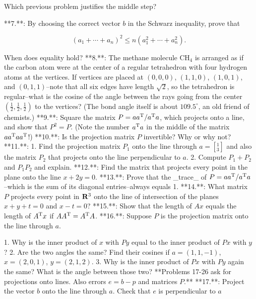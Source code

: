 Which previous problem justifies the middle step?

**7.**: By choosing the correct vector \(b\) in the Schwarz inequality, prove that

\[(a_{1}+\cdots+a_{n})^{2}\leq n(a_{1}^{2}+\cdots+a_{n}^{2}).\]

When does equality hold?
**8.**: The methane molecule CH\({}_{4}\) is arranged as if the carbon atom were at the center of a regular tetrahedron with four hydrogen atoms at the vertices. If vertices are placed at \((0,0,0)\), \((1,1,0)\), \((1,0,1)\), and \((0,1,1)\)--note that all six edges have length \(\sqrt{2}\), so the tetrahedron is regular--what is the cosine of the angle between the rays going from the center \((\frac{1}{2},\frac{1}{2},\frac{1}{2})\) to the vertices? (The bond angle itself is about \(109.5^{\circ}\), an old friend of chemists.)
**9.**: Square the matrix \(P=aa^{\rm T}/a^{\rm T}a\), which projects onto a line, and show that \(P^{2}=P\). (Note the number \(a^{\rm T}a\) in the middle of the matrix \(aa^{\rm T}aa^{\rm T}\)!)
**10.**: Is the projection matrix \(P\) invertible? Why or why not?
**11.**: 1. Find the projection matrix \(P_{1}\) onto the line through \(a=[^{1}_{3}]\) and also the matrix \(P_{2}\) that projects onto the line perpendicular to \(a\). 2. Compute \(P_{1}+P_{2}\) and \(P_{1}P_{2}\) and explain.
**12.**: Find the matrix that projects every point in the plane onto the line \(x+2y=0\).
**13.**: Prove that the _trace_ of \(P=aa^{\rm T}/a^{\rm T}a\)--which is the sum of its diagonal entries--always equals 1.
**14.**: What matrix \(P\) projects every point in \({\bf R}^{3}\) onto the line of intersection of the planes \(x+y+t=0\) and \(x-t=0\)?
**15.**: Show that the length of \(Ax\) equals the length of \(A^{\rm T}x\) if \(AA^{\rm T}=A^{\rm T}A\).
**16.**: Suppose \(P\) is the projection matrix onto the line through \(a\).

1. Why is the inner product of \(x\) with \(Py\) equal to the inner product of \(Px\) with \(y\)?
2. Are the two angles the same? Find their cosines if \(a=(1,1,-1)\), \(x=(2,0,1)\), \(y=(2,1,2)\).
3. Why is the inner product of \(Px\) with \(Py\) again the same? What is the angle between those two?
**Problems 17-26 ask for projections onto lines. Also errors \(e=b-p\) and matrices \(P\).**
**17.**: Project the vector \(b\) onto the line through \(a\). Check that \(e\) is perpendicular to \(a\) 